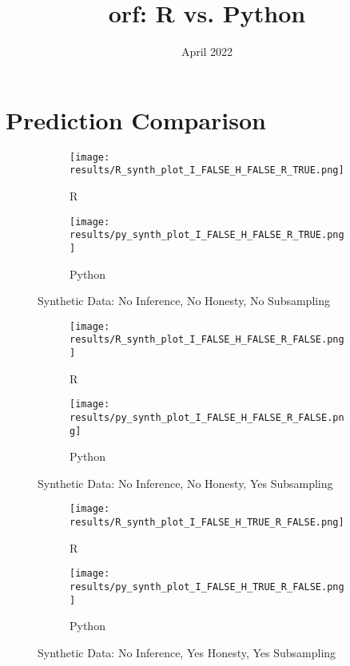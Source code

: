 \documentclass[landscape]{article}
\title{orf: R vs. Python}
\date{April 2022}
\begin{document}
\maketitle

\pagebreak

\section{Prediction Comparison}

\begin{figure}
\centering
\begin{subfigure}{.5\textwidth}
  \centering
  \texttt{[image: results/R\_synth\_plot\_I\_FALSE\_H\_FALSE\_R\_TRUE.png]}
  \caption{R}
  \label{fig:sub1}
\end{subfigure}%
\begin{subfigure}{.5\textwidth}
  \centering
  \texttt{[image: results/py\_synth\_plot\_I\_FALSE\_H\_FALSE\_R\_TRUE.png]}
  \caption{Python}
  \label{fig:sub2}
\end{subfigure}
\caption{Synthetic Data: No Inference, No Honesty, No Subsampling}
\label{fig:test}
\end{figure}

\begin{figure}
\centering
\begin{subfigure}{.5\textwidth}
  \centering
  \texttt{[image: results/R\_synth\_plot\_I\_FALSE\_H\_FALSE\_R\_FALSE.png]}
  \caption{R}
  \label{fig:sub1}
\end{subfigure}%
\begin{subfigure}{.5\textwidth}
  \centering
  \texttt{[image: results/py\_synth\_plot\_I\_FALSE\_H\_FALSE\_R\_FALSE.png]}
  \caption{Python}
  \label{fig:sub2}
\end{subfigure}
\caption{Synthetic Data: No Inference, No Honesty, Yes Subsampling}
\label{fig:test}
\end{figure}

\begin{figure}
\centering
\begin{subfigure}{.5\textwidth}
  \centering
  \texttt{[image: results/R\_synth\_plot\_I\_FALSE\_H\_TRUE\_R\_FALSE.png]}
  \caption{R}
  \label{fig:sub1}
\end{subfigure}%
\begin{subfigure}{.5\textwidth}
  \centering
  \texttt{[image: results/py\_synth\_plot\_I\_FALSE\_H\_TRUE\_R\_FALSE.png]}
  \caption{Python}
  \label{fig:sub2}
\end{subfigure}
\caption{Synthetic Data: No Inference, Yes Honesty, Yes Subsampling}
\label{fig:test}
\end{figure}
\end{document}
